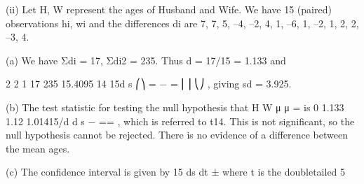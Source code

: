 \documentclass[a4paper,12pt]{article}
\begin{document}
 
(ii) Let H, W represent the ages of Husband and Wife.  We have 15 (paired) observations hi, wi and the differences di are 
 7,  7,  5,  –4,  –2,  4,  1,  –6,  1,  –2,  1,  2,  2,  –3,  4. 
 
 
(a) We have Σdi = 17,  Σdi2 = 235.  Thus d = 17/15 = 1.133 and 
 
2 2 1 17 235 15.4095 14 15d s ⎛⎞ = − = ⎜⎟ ⎝⎠
,  giving sd = 3.925. 
 
 
(b) The test statistic for testing the null hypothesis that H W μ μ = is 
 0 1.133 1.12 1.01415/d d s − == , 
 which is referred to t14.  This is not significant, so the null hypothesis cannot be rejected.  There is no evidence of a difference between the mean ages. 
 
 
(c) The confidence interval is given by 
15 ds dt ± where t is the doubletailed 5%
\end{document}
